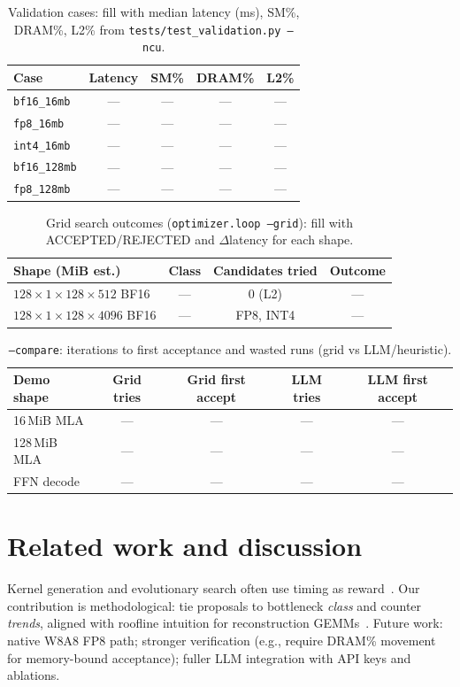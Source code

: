\documentclass[11pt]{article}
\begin{document}
\begin{table}[h]
\centering
\caption{Validation cases: fill with median latency (ms), SM\%, DRAM\%, L2\% from \texttt{tests/test\_validation.py --ncu}.}
\begin{tabular}{@{}lcccc@{}}
\toprule
Case & Latency & SM\% & DRAM\% & L2\% \\
\midrule
\texttt{bf16\_16mb} & --- & --- & --- & --- \\
\texttt{fp8\_16mb}  & --- & --- & --- & --- \\
\texttt{int4\_16mb} & --- & --- & --- & --- \\
\texttt{bf16\_128mb}& --- & --- & --- & --- \\
\texttt{fp8\_128mb} & --- & --- & --- & --- \\
\bottomrule
\end{tabular}
\end{table}

\begin{table}[h]
\centering
\caption{Grid search outcomes (\texttt{optimizer.loop --grid}): fill with ACCEPTED/REJECTED and $\Delta$latency for each shape.}
\begin{tabular}{@{}lccc@{}}
\toprule
Shape (MiB est.) & Class & Candidates tried & Outcome \\
\midrule
$128\times1\times128\times512$ BF16 & --- & 0 (L2) & --- \\
$128\times1\times128\times4096$ BF16 & --- & FP8, INT4 & --- \\
\bottomrule
\end{tabular}
\end{table}

\begin{table}[h]
\centering
\caption{\texttt{--compare}: iterations to first acceptance and wasted runs (grid vs LLM/heuristic).}
\begin{tabular}{@{}lcccc@{}}
\toprule
Demo shape & Grid tries & Grid first accept & LLM tries & LLM first accept \\
\midrule
16\,MiB MLA & --- & --- & --- & --- \\
128\,MiB MLA & --- & --- & --- & --- \\
FFN decode & --- & --- & --- & --- \\
\bottomrule
\end{tabular}
\end{table}

\section{Related work and discussion}
Kernel generation and evolutionary search often use timing as reward~\citep{kernelcompass2026}.
Our contribution is methodological: tie proposals to bottleneck \emph{class} and counter \emph{trends}, aligned with roofline intuition for reconstruction GEMMs~\citep{cachebarrier2026}.
Future work: native W8A8 FP8 path; stronger verification (e.g., require DRAM\% movement for memory-bound acceptance); fuller LLM integration with API keys and ablations.
\end{document}

